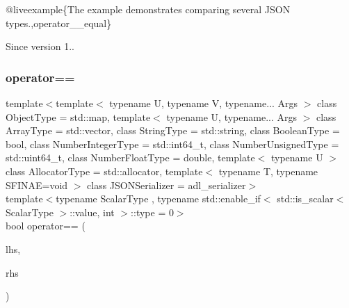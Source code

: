 @liveexample\{The example demonstrates comparing several J\+S\+ON types.,operator\+\_\+\+\_\+equal\}

\begin{DoxySince}{Since}
version 1.. 
\end{DoxySince}
\mbox{\label{classnlohmann_1_1basic__json_aef302e3ae215e46e5035d0e4fdf47235}} 
\subsubsection{\texorpdfstring{operator==}{operator==}\hspace{0.1cm}{\footnotesize\ttfamily [3/3]}}
{\footnotesize\ttfamily template$<$template$<$ typename U, typename V, typename... Args $>$ class Object\+Type = std\+::map, template$<$ typename U, typename... Args $>$ class Array\+Type = std\+::vector, class String\+Type  = std\+::string, class Boolean\+Type  = bool, class Number\+Integer\+Type  = std\+::int64\+\_\+t, class Number\+Unsigned\+Type  = std\+::uint64\+\_\+t, class Number\+Float\+Type  = double, template$<$ typename U $>$ class Allocator\+Type = std\+::allocator, template$<$ typename T, typename S\+F\+I\+N\+A\+E=void $>$ class J\+S\+O\+N\+Serializer = adl\+\_\+serializer$>$ \\
template$<$typename Scalar\+Type , typename std\+::enable\+\_\+if$<$ std\+::is\+\_\+scalar$<$ Scalar\+Type $>$\+::value, int $>$\+::type  = 0$>$ \\
bool operator== (\begin{DoxyParamCaption}\item[{const Scalar\+Type}]{lhs,  }\item[{\mbox{\hyperlink{classnlohmann_1_1basic__json_a4057c5425f4faacfe39a8046871786ca}{const\+\_\+reference}}}]{rhs }\end{DoxyParamCaption})\hspace{0.3cm}{\ttfamily [friend]}}



